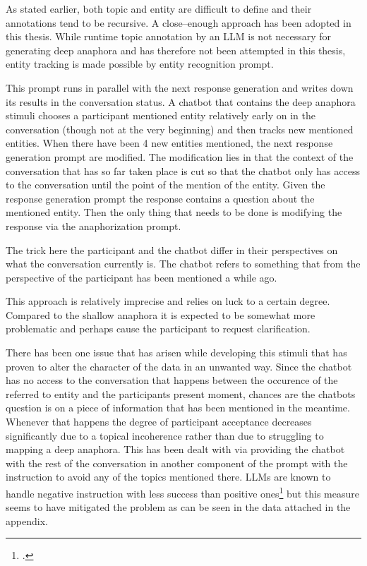 \documentclass[12pt]{report}
\begin{document}
{\par
As stated earlier,
both topic and entity are difficult to define
and their annotations tend to be recursive.
A close–enough approach has been adopted in this thesis.
While runtime topic annotation by an LLM
is not necessary for generating deep anaphora
and has therefore not been attempted in this thesis,
entity tracking is made possible by
entity recognition prompt.

This prompt runs in parallel with the next response generation
and writes down its results in the conversation status.
A chatbot that contains the deep anaphora stimuli
chooses a participant mentioned entity
relatively early on in the conversation
(though not at the very beginning)
and then tracks new mentioned entities.
When there have been 4 new entities mentioned,
the next response generation prompt are modified.
The modification lies in that the context of the conversation
that has so far taken place is cut so
that the chatbot only has access
to the conversation until the point of the mention of the entity.
Given the response generation prompt
the response contains a question
about the mentioned entity.
Then the only thing that needs to be done
is modifying the response via the anaphorization prompt.

The trick here the participant and the chatbot differ in their perspectives
on what the conversation currently is.
The chatbot refers to something
that from the perspective of the participant
has been mentioned a while ago.

This approach is relatively imprecise and relies on luck to a certain degree.
Compared to the shallow anaphora
it is expected to be somewhat more problematic
and perhaps cause the participant to request clarification.

\par
There has been one issue that has arisen while developing this stimuli
that has proven to alter the character of the data in an unwanted way.
Since the chatbot has no access to the conversation that happens
between the occurence of the referred to entity and the participants present moment,
chances are the chatbots question is on
a piece of information that has been mentioned in the meantime.
Whenever that happens the degree of participant acceptance decreases significantly
due to a topical incoherence rather than
due to struggling to mapping a deep anaphora.
This has been dealt with via providing the chatbot
with the rest of the conversation in another component of the prompt
with the instruction to avoid any of the topics mentioned there.
LLMs are known to handle negative instruction with less success than positive ones\footcite{negated_prompts}
but this measure seems to have mitigated the problem
as can be seen in the data attached in the appendix.

}
\end{document}
